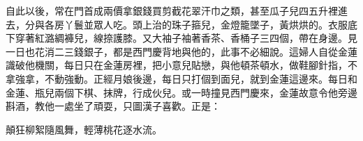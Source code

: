 自此以後，常在門首成兩價拿銀錢買剪截花翠汗巾之類，甚至瓜子兒四五升裡進去，分與各房丫鬟並眾人吃。頭上治的珠子箍兒，金燈籠墜子，黃烘烘的。衣服底下穿著紅潞綢褲兒，線捺護膝。又大袖子袖著香茶、香桶子三四個，帶在身邊。見一日也花消二三錢銀子，都是西門慶背地與他的，此事不必細說。這婦人自從金蓮識破他機關，每日只在金蓮房裡，把小意兒貼戀，與他頓茶頓水，做鞋腳針指，不拿強拿，不動強動。正經月娘後邊，每日只打個到面兒，就到金蓮這邊來。每日和金蓮、瓶兒兩個下棋、抹牌，行成伙兒。或一時撞見西門慶來，金蓮故意令他旁邊斟酒，教他一處坐了頑耍，只圖漢子喜歡。正是：

顛狂柳絮隨風舞，輕薄桃花逐水流。

